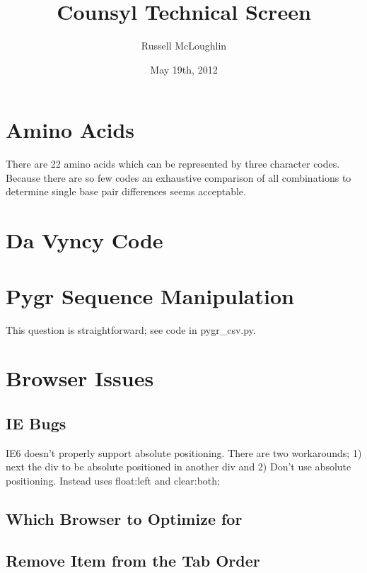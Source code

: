 \documentclass[12pt]{amsart}
\title{Counsyl Technical Screen}
\author{Russell McLoughlin}
\date{May 19th, 2012}
\begin{document}
\maketitle

\section{Amino Acids}

There are 22 amino acids which can be represented by three character codes. Because there are so few codes an exhaustive comparison of all combinations to determine single base pair differences seems acceptable.

\section{Da Vyncy Code}



\section{Pygr Sequence Manipulation}

This question is straightforward; see code in pygr\_csv.py.

\section{Browser Issues}

\subsection{IE Bugs}


IE6 doesn't properly support absolute positioning. There are two workarounds; 1) next the div to be absolute positioned in another div and 2) Don't use absolute positioning. Instead uses float:left and clear:both; 

\subsection{Which Browser to Optimize for}

\subsection{Remove Item from the Tab Order}
\end{document}
